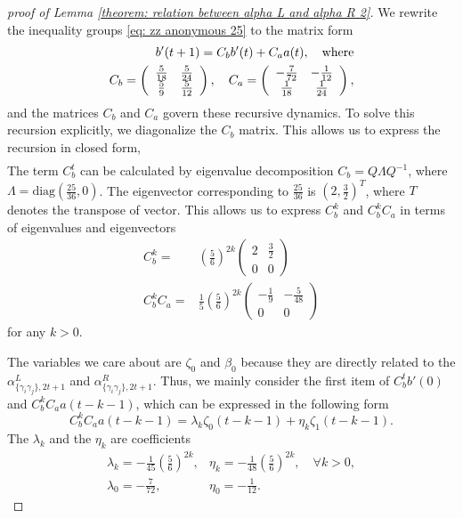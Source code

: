 \documentclass[showpacs,twocolumn,aps,prx,long bibliography,superscriptaddress,notitlepage]{revtex4-1}
\newcommand{\alpl}{\alpha_{\{\gamma_i\gamma_j\}, 2t+1}^{L}}
\newcommand{\alpr}{\alpha_{\{\gamma_i\gamma_j\}, 2t+1}^{R}}
\begin{document}
\begin{proof}[proof of Lemma \ref{theorem: relation between alpha L and alpha R 2}]
    
    We rewrite the inequality groups \eqref{eq: zz anonymous 25} to the matrix form
    \begin{align}
        b'(t+1)=C_b b'(t)+C_a a(t), \quad \text{where}\\
        C_b=\left(\begin{array}{c c}
        \frac{5}{18} & \frac{5}{24} \\ 
        \frac{5}{9} & \frac{5}{12}
        \end{array}\right), \quad C_a=\left(\begin{array}{cc}
        -\frac{7}{72} & -\frac{1}{12} \\
        \frac{1}{18} & \frac{1}{24}
        \end{array}\right),
    \end{align}
    and the matrices $C_b$ and $C_a$ govern these recursive dynamics. To solve this recursion explicitly, we diagonalize the $C_b$ matrix. This allows us to express the recursion in closed form,
    \begin{align}
    \end{align}
The term $C_b^t$ can be calculated by eigenvalue decomposition $C_b=Q \Lambda Q^{-1}$, where $\Lambda=\text{diag}(\frac{25}{36},0)$. The eigenvector corresponding to $\frac{25}{36}$ is $(2, \frac{3}{2})^T$, where $T$ denotes the transpose of vector. This allows us to express $C_b^k$ and $C_b^kC_a$ in terms of eigenvalues and eigenvectors
\begin{align}
    C_b^k=&\left(\frac{5}{6}\right)^{2k}\begin{pmatrix}
2 & \frac{3}{2} \\
0 & 0
\end{pmatrix}\\
C_b^kC_a =& \frac{1}{5}\left(\frac{5}{6}\right)^{2k}\begin{pmatrix}
-\frac{1}{9} & -\frac{5}{48} \\
0 & 0
\end{pmatrix}
\end{align}
for any $k>0$. 

The variables we care about are $\zeta_0$ and $\beta_0$ because they are directly related to the $\alpl$ and $\alpr$. Thus, we mainly consider the first item of $C_b^t b'(0)$ and $C_b^kC_aa(t-k-1)$, which can be expressed in the following form
\begin{equation}
    C_b^kC_aa(t-k-1) = \lambda_k \zeta_0(t-k-1)+\eta_k \zeta_1(t-k-1).
\end{equation}
The $\lambda_k$ and the $\eta_k$ are coefficients 
\begin{equation}
    \begin{array}{ll}
\lambda_k=-\frac{1}{45}\left(\frac{5}{6}\right)^{2 k}, & \eta_k=-\frac{1}{48}\left(\frac{5}{6}\right)^{2 k}, \quad \forall k>0,  \\
\lambda_0=-\frac{7}{72}, & \eta_0=-\frac{1}{12}.
\end{array}
\end{equation}


\end{proof}
\end{document}
